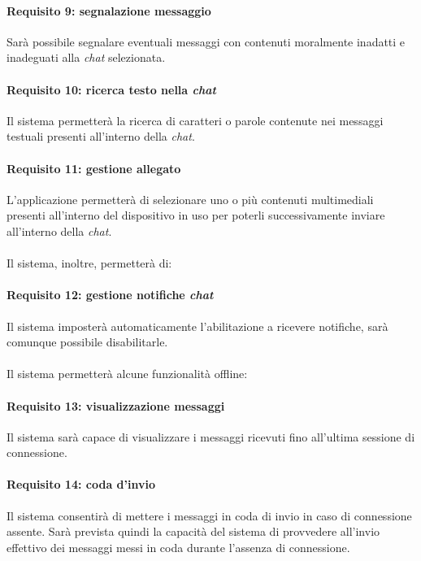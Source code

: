 \begin{enumerate}
\paragraph{Requisito 9: segnalazione messaggio\\}
Sarà possibile segnalare eventuali messaggi con contenuti moralmente inadatti e inadeguati alla \emph{chat} selezionata.

\paragraph{Requisito 10: ricerca testo nella \emph{chat}\\}
Il sistema permetterà la ricerca di caratteri o parole contenute nei messaggi testuali presenti all’interno della \emph{chat}.

\paragraph{Requisito 11: gestione allegato\\}
L’applicazione permetterà di selezionare uno o più contenuti multimediali presenti all’interno del dispositivo in uso per poterli successivamente inviare all’interno della \emph{chat}.\\
\\
Il sistema, inoltre, permetterà di:

\paragraph{Requisito 12: gestione notifiche \emph{chat}\\}
Il sistema imposterà automaticamente l’abilitazione a ricevere notifiche, sarà comunque possibile disabilitarle.\\
\\
Il sistema permetterà alcune funzionalità offline:

\paragraph{Requisito 13: visualizzazione messaggi\\}
Il sistema sarà capace di visualizzare i messaggi ricevuti fino all’ultima sessione di connessione.

\paragraph{Requisito 14: coda d'invio\\}
Il sistema consentirà di mettere i messaggi in coda di invio in caso di connessione assente. Sarà prevista quindi la capacità del sistema di provvedere all’invio effettivo dei messaggi messi in coda durante l’assenza di connessione.


\end{enumerate}
